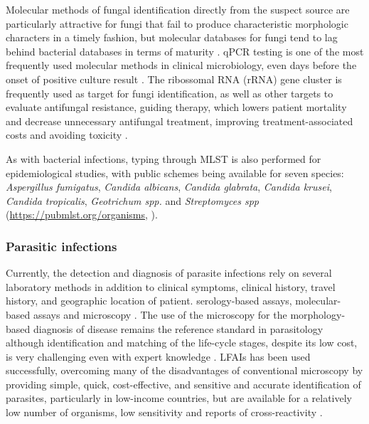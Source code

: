 Molecular methods of fungal identification directly from the suspect source are particularly attractive for fungi that fail to produce characteristic morphologic characters in a timely fashion, but molecular databases for fungi tend to lag behind bacterial databases in terms of maturity \citep{ramanan_laboratory_2017}. qPCR testing  is one of the most frequently used
molecular methods in clinical microbiology, even days before the onset of positive culture result \citep{kourkoumpetis_polymerase_2012}. The ribossomal RNA (rRNA) gene cluster is frequently used as target for fungi identification, as well as other targets to evaluate antifungal resistance, guiding therapy, which lowers patient mortality and decrease unnecessary antifungal treatment, improving treatment-associated costs and avoiding toxicity \citep{kourkoumpetis_polymerase_2012}. 

As with bacterial infections, typing through MLST is also performed for epidemiological studies, with public schemes being available for seven species: \textit{Aspergillus fumigatus}, \textit{Candida albicans}, \textit{Candida glabrata}, \textit{Candida krusei}, \textit{Candida tropicalis}, \textit{Geotrichum spp.} and \textit{Streptomyces spp} (\url{https://pubmlst.org/organisms}, \cite{jolley_open-access_2018}).

\subsubsection{Parasitic infections}

Currently, the detection and diagnosis of parasite infections rely on several laboratory methods in addition to clinical symptoms, clinical history, travel history, and geographic location of patient. serology-based assays, molecular-based assays and microscopy  \citep{ndao_diagnosis_2009}. The use of the microscopy for the morphology-based diagnosis of disease remains the reference standard in parasitology although identification and matching of the life-cycle stages, despite its low cost, is very challenging even with expert knowledge \citep{blasco-costa_molecular_2016}. LFAIs has been used successfully, overcoming many of the disadvantages of conventional microscopy by providing simple, quick, cost-effective, and sensitive and accurate identification of parasites, particularly in low-income countries, but are available for a relatively low number of organisms, low sensitivity and reports of cross-reactivity \citep{momcilovic_rapid_2019, robert-gangneux_epidemiology_2012, rajput_false_2018}. 

